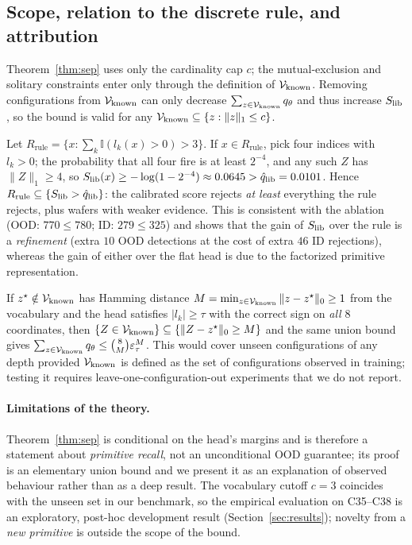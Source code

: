 \subsection{Scope, relation to the discrete rule, and attribution}
\begin{remark}
Theorem~\ref{thm:sep} uses only the cardinality cap $c$; the mutual-exclusion and solitary
constraints enter only through the definition of $\mathcal{V}_{\mathrm{known}}$. Removing configurations from
$\mathcal{V}_{\mathrm{known}}$ can only decrease $\sum_{z\in\mathcal{V}_{\mathrm{known}}}q_\theta$ and thus increase $S_{\mathrm{lib}}$, so the bound is
valid for any $\mathcal{V}_{\mathrm{known}}\subseteq\{z:\|z\|_1\le c\}$.
\end{remark}

\begin{remark}\label{rem:trivial}
Let $R_{\mathrm{rule}}=\{x:\sum_k\mathbb{I}(l_k(x)>0)>3\}$. If $x\in R_{\mathrm{rule}}$, pick four
indices with $l_k>0$; the probability that all four fire is at least $2^{-4}$, and any such $Z$
has $\|Z\|_1\ge4$, so $S_{\mathrm{lib}}(x)\ge-\log(1-2^{-4})\approx0.0645>\hat q_{\mathrm{lib}}=0.0101$. Hence
$R_{\mathrm{rule}}\subseteq\{S_{\mathrm{lib}}>\hat q_{\mathrm{lib}}\}$: the calibrated score rejects \emph{at least}
everything the rule rejects, plus wafers with weaker evidence. This is consistent with the
ablation (OOD: $770\le780$; ID: $279\le325$) and shows that the gain of $S_{\mathrm{lib}}$ over the rule is a
\emph{refinement} (extra $10$ OOD detections at the cost of extra $46$ ID rejections), whereas the gain of
either over the flat head is due to the factorized primitive representation.
\end{remark}

\begin{remark}\label{rem:hamming}
If $z^\star\notin\mathcal{V}_{\mathrm{known}}$ has Hamming distance $M=\min_{z\in\mathcal{V}_{\mathrm{known}}}\|z-z^\star\|_0\ge1$ from the
vocabulary and the head satisfies $|l_k|\ge\tau$ with the correct sign on \emph{all} $8$ coordinates,
then $\{Z\in\mathcal{V}_{\mathrm{known}}\}\subseteq\{\|Z-z^\star\|_0\ge M\}$ and the same union bound gives
$\sum_{z\in\mathcal{V}_{\mathrm{known}}}q_\theta\le\binom8M\varepsilon_\tau^M$. This would cover unseen configurations of any depth
provided $\mathcal{V}_{\mathrm{known}}$ is defined as the set of configurations observed in training; testing it requires
leave-one-configuration-out experiments that we do not report.
\end{remark}

\paragraph{Limitations of the theory.}
Theorem~\ref{thm:sep} is conditional on the head's margins and is therefore a statement about
\emph{primitive recall}, not an unconditional OOD guarantee; its proof is an elementary union bound and we
present it as an explanation of observed behaviour rather than as a deep result. The vocabulary
cutoff $c=3$ coincides with the unseen set in our benchmark, so the empirical evaluation on
C35--C38 is an exploratory, post-hoc development result (Section~\ref{sec:results}); novelty from a
\emph{new primitive} is outside the scope of the bound.

